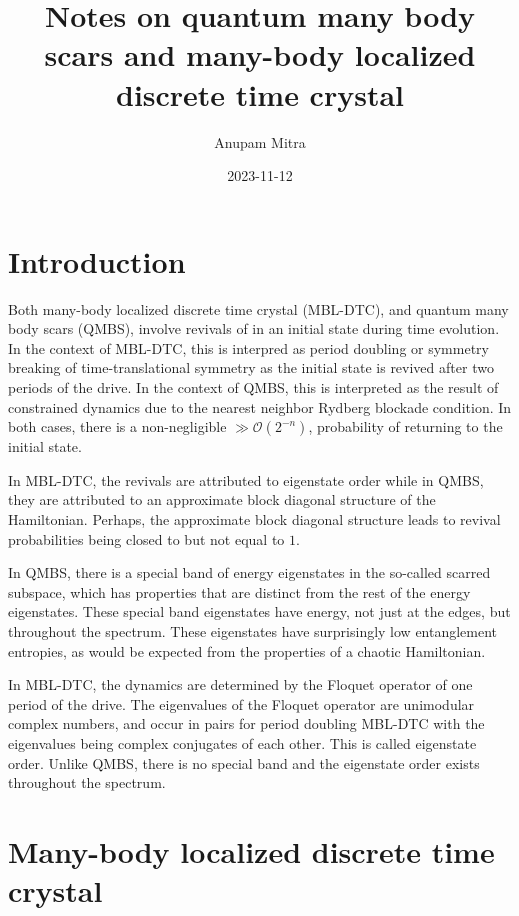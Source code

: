\documentclass[longbibliography]{revtex4-2}
\begin{document}
\title{Notes on quantum many body scars and many-body localized discrete time
crystal}
\author{Anupam Mitra}
\date{2023-11-12}

\maketitle

\hypertarget{introduction}{%
\section{Introduction}\label{introduction}}

Both many-body localized discrete time crystal (MBL-DTC), and quantum
many body scars (QMBS), involve revivals of in an initial state during
time evolution. In the context of MBL-DTC, this is interpred as period
doubling or symmetry breaking of time-translational symmetry as the
initial state is revived after two periods of the drive. In the context
of QMBS, this is interpreted as the result of constrained dynamics due
to the nearest neighbor Rydberg blockade condition. In both cases, there
is a non-negligible \(\gg \mathcal{O}(2^{-n})\), probability of
returning to the initial state.

In MBL-DTC, the revivals are attributed to eigenstate order while in
QMBS, they are attributed to an approximate block diagonal structure of
the Hamiltonian. Perhaps, the approximate block diagonal structure leads
to revival probabilities being closed to but not equal to \(1\).

In QMBS, there is a special band of energy eigenstates in the so-called
scarred subspace, which has properties that are distinct from the rest
of the energy eigenstates. These special band eigenstates have energy,
not just at the edges, but throughout the spectrum. These eigenstates
have surprisingly low entanglement entropies, as would be expected from
the properties of a chaotic Hamiltonian.

In MBL-DTC, the dynamics are determined by the Floquet operator of one
period of the drive. The eigenvalues of the Floquet operator are
unimodular complex numbers, and occur in pairs for period doubling
MBL-DTC with the eigenvalues being complex conjugates of each other.
This is called eigenstate order. Unlike QMBS, there is no special band
and the eigenstate order exists throughout the spectrum.

\hypertarget{many-body-localized-discrete-time-crystal}{%
\section{Many-body localized discrete time crystal}\label{many-body-localized-discrete-time-crystal}}
\end{document}

